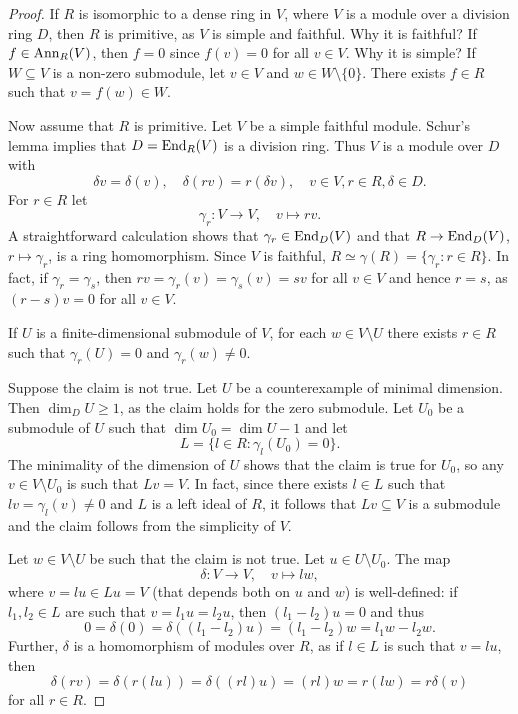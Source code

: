\begin{proof}
	If $R$ is isomorphic to a dense ring in $V$, where
	$V$ is a module over a division ring $D$, then $R$
	is primitive, as $V$ is simple and faithful. Why it is faithful? If 
	$f\in\operatorname{Ann}_R(V)$, then $f=0$ since $f(v)=0$ for all $v\in V$. Why it is simple? 
	If $W\subseteq V$ is a non-zero submodule, let $v\in V$ and $w\in
	W\setminus\{0\}$. There exists $f\in R$ such that $v=f(w)\in W$. 

	Now assume that $R$ is primitive. Let $V$ be a simple faithful module.
	Schur's lemma implies that $D=\operatorname{End}_R(V)$ is a division ring. Thus $V$ is
	a module over $D$ with 
	\[
	\delta v=\delta(v),\quad
	\delta(rv)=r(\delta v),\quad
	v\in V,r\in R,\delta\in D.
	\]
	For $r\in R$ let  
	\[
		\gamma_r\colon V\to V,\quad
		v\mapsto rv.
	\]
	A straightforward calculation shows that $\gamma_r\in\operatorname{End}_D(V)$ and that
    $R\to\operatorname{End}_D(V)$,
	$r\mapsto\gamma_r$, is a ring homomorphism. Since $V$ is faithful,
	$R\simeq\gamma(R)=\{\gamma_r:r\in R\}$. In fact, if $\gamma_r=\gamma_s$, then 
	$rv=\gamma_r(v)=\gamma_s(v)=sv$ for all $v\in V$ and hence $r=s$, as
	$(r-s)v=0$ for all $v\in V$.

	\begin{claim}
		If $U$ is a finite-dimensional submodule of $V$, 
		for each $w\in V\setminus U$ there exists $r\in R$ such that 
		$\gamma_r(U)=0$ and $\gamma_r(w)\ne0$.
	\end{claim}

	Suppose the claim is not true. Let $U$ be a counterexample of minimal  
	dimension. Then
	$\dim_DU\geq1$, as the claim holds for the zero submodule. Let 
	$U_0$ be a submodule of $U$ such that 
	$\dim U_0=\dim U-1$ and let 
	\[
		L=\{l\in R:\gamma_l(U_0)=0\}.
	\]
	The minimality of the dimension of $U$ shows that the claim is true for $U_0$, so
	any $v\in V\setminus U_0$ is such that $Lv=V$. In fact, since there exists $l\in
	L$ such that $lv=\gamma_l(v)\ne 0$ and $L$ is a left ideal of $R$, it follows
	that $Lv\subseteq V$ is a submodule and the claim follows from the simplicity of
	$V$.
	
	Let $w\in V\setminus U$ be such that the claim is not true. Let $u\in
	U\setminus U_0$. The map  
	\[
		\delta\colon V\to V,\quad
		v\mapsto lw,
	\]
	where $v=lu\in Lu=V$ (that depends both on $u$ and $w$) 
	is well-defined: if $l_1,l_2\in L$ are such that 
	$v=l_1u=l_2u$, then $(l_1-l_2)u=0$ and thus 
	\[
		0=\delta(0)=\delta((l_1-l_2)u)=(l_1-l_2)w=l_1w-l_2w. 
	\]
	Further, $\delta$ is a homomorphism of modules over $R$, as if 
	$l\in L$ is such that $v=lu$, then 
	\[
		\delta(rv)=\delta(r(lu))=\delta( (rl)u)=(rl)w=r(lw)=r\delta(v)
	\]
	for all $r\in R$.


\end{proof}
